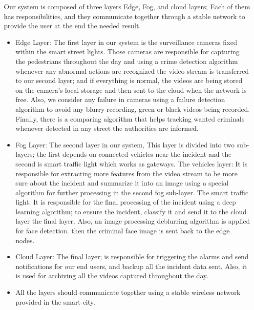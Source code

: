 \documentclass[12pt]{article}
\begin{document}
Our system is composed of three layers Edge, Fog, and cloud layers; Each of them has responsibilities, and they communicate together through a stable network to provide the user at the end the needed result.
\begin{itemize}
\item Edge Layer: The first layer in our system is the surveillance cameras fixed within the smart street lights. Those cameras are responsible for capturing the pedestrians throughout the day and using a crime detection algorithm whenever any abnormal actions are recognized the video stream is transferred to our second layer; and if everything is normal, the videos are being stored on the camera's local storage and then sent to the cloud when the network is free. Also, we consider any failure in cameras using a failure detection algorithm to avoid any blurry recording, green or black videos being recorded. Finally, there is a comparing algorithm that helps tracking wanted criminals whenever detected in any street the authorities are informed.
\item Fog Layer: The second layer in our system, This layer is divided into two sub-layers; the first depends on connected vehicles near the incident and the second is smart traffic light which works as gateways.
\subitem The vehicles layer: It is responsible for extracting more features from the video stream to be more sure about the incident and summarize it into an image using a special algorithm for further processing in the second fog sub-layer.
\subitem The smart traffic light: It is responsible for the final processing of the incident using a deep learning algorithm; to ensure the incident, classify it and send it to the cloud layer the final layer. Also, an image processing deblurring algorithm is applied for face detection. then the criminal face image is sent back to the edge nodes.
\item Cloud Layer: The final layer; is responsible for triggering the alarms and send notifications for our end users, and backup all the incident data sent. Also, it is used for archiving all the videos captured throughout the day.
\item All the layers should communicate together using a stable wireless network provided in the smart city.
\end{itemize} 
\end{document}
